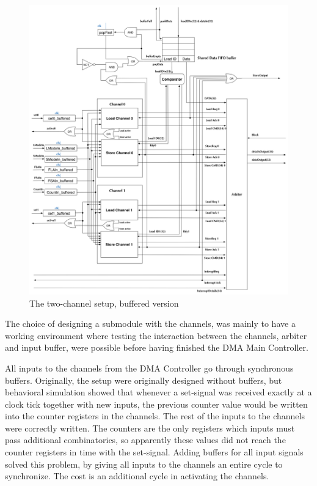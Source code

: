 \begin{figure}[h!]
    \centering
    \includegraphics[width=1.25\textwidth]{Figures/DMA/TwoChannelSetUpBuffered}
    \caption{The two-channel setup, buffered version}
    \label{fig:twoChannelSetup}
\end{figure}

The choice of designing a submodule with the channels, was mainly to have a working environment where testing the interaction between the channels, arbiter and input buffer, were possible before having finished the DMA Main Controller.

All inputs to the channels from the DMA Controller go through synchronous buffers.
Originally, the setup were originally designed without buffers, but behavioral simulation showed that whenever a set-signal was received exactly at a clock tick together with new inputs, the previous counter value would be written into the counter registers in the channels.
The rest of the inputs to the channels were correctly written.
The counters are the only registers which inputs must pass additional combinatorics, so apparently these values did not reach the counter registers in time with the set-signal.
Adding buffers for all input signals solved this problem, by giving all inputs to the channels an entire cycle to synchronize.
The cost is an additional cycle in activating the channels.

